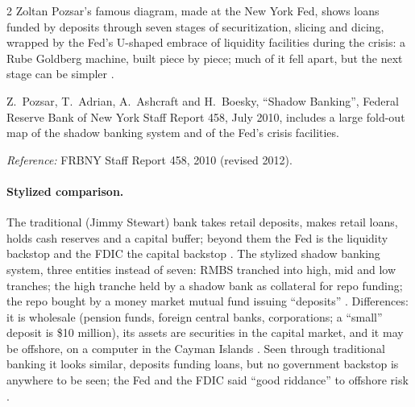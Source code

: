 \begin{paracol}{2}
Zoltan Pozsar's famous diagram, made at the New York Fed, shows loans funded by deposits through seven stages of securitization, slicing and dicing, wrapped by the
Fed's U-shaped embrace of liquidity facilities during the crisis: a Rube Goldberg machine, built piece by piece; much of it fell apart, but the next stage can be
simpler .

\begin{history}
Z.~Pozsar, T.~Adrian, A.~Ashcraft and H.~Boesky, ``Shadow Banking'', Federal Reserve Bank of New York Staff Report 458, July 2010, includes a large fold-out map of
the shadow banking system and of the Fed's crisis facilities.\par
\emph{Reference:} FRBNY Staff Report 458, 2010 (revised 2012).
\end{history}

\paragraph{Stylized comparison.} The traditional (Jimmy Stewart) bank takes retail deposits, makes retail loans, holds cash reserves and a capital buffer; beyond
them the Fed is the liquidity backstop and the FDIC the capital backstop . The stylized shadow banking system, three
entities instead of seven: RMBS tranched into high, mid and low tranches; the high tranche held by a shadow bank as collateral for repo funding; the repo bought by
a money market mutual fund issuing ``deposits'' . Differences: it is wholesale (pension funds, foreign central banks,
corporations; a ``small'' deposit is \$10 million), its assets are securities in the capital market, and it may be offshore, on a computer in the Cayman Islands
. Seen through traditional banking it looks similar, deposits funding loans, but no government backstop
is anywhere to be seen; the Fed and the FDIC said ``good riddance'' to offshore risk .

\begin{nfigure}
\begin{taccts}
\quad
{}\quad
{}
\end{taccts}
\caption{Traditional bank, backstopped by Fed and FDIC, versus a stylized shadow banking chain with no government backstop .}\label{fig:cbs-chain}
\end{nfigure}


\end{paracol}
